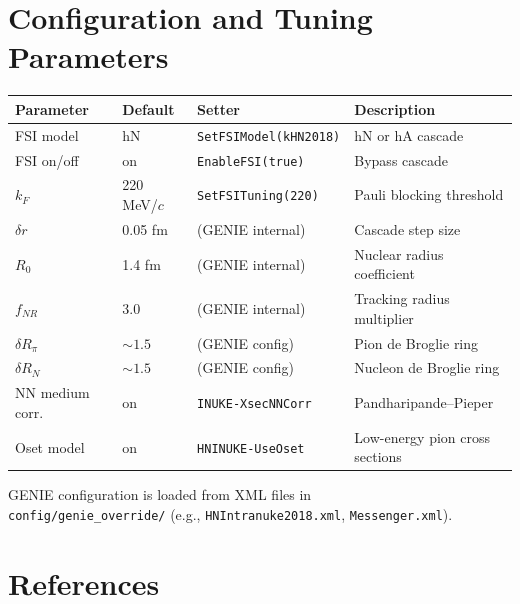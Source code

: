\documentclass[11pt,a4paper]{article}
\begin{document}
\section{Configuration and Tuning Parameters}

\begin{center}
\begin{tabular}{llll}
\toprule
Parameter & Default & Setter & Description \\
\midrule
FSI model & hN & \texttt{SetFSIModel(kHN2018)} & hN or hA cascade \\
FSI on/off & on & \texttt{EnableFSI(true)} & Bypass cascade \\
$k_{F}$ & 220 MeV/$c$ & \texttt{SetFSITuning(220)} & Pauli blocking threshold \\
$\delta r$ & 0.05 fm & (GENIE internal) & Cascade step size \\
$R_{0}$ & 1.4 fm & (GENIE internal) & Nuclear radius coefficient \\
$f_{NR}$ & 3.0 & (GENIE internal) & Tracking radius multiplier \\
$\delta R_{\pi}$ & ${\sim}1.5$ & (GENIE config) & Pion de Broglie ring \\
$\delta R_{N}$ & ${\sim}1.5$ & (GENIE config) & Nucleon de Broglie ring \\
NN medium corr. & on & \texttt{INUKE-XsecNNCorr} & Pandharipande--Pieper \\
Oset model & on & \texttt{HNINUKE-UseOset} & Low-energy pion cross sections \\
\bottomrule
\end{tabular}
\end{center}

GENIE configuration is loaded from XML files in\\
\texttt{config/genie\_override/} (e.g., \texttt{HNIntranuke2018.xml},
\texttt{Messenger.xml}).

\section{References}
\end{document}
